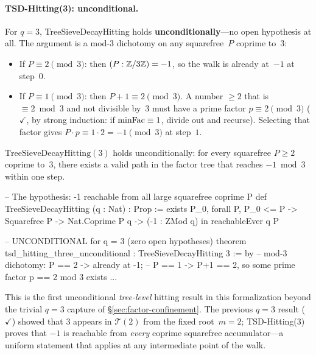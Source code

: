 \paragraph{TSD-Hitting(3): unconditional.}
For $q = 3$, TreeSieveDecayHitting holds \textbf{unconditionally}---no
open hypothesis at all.  The argument is a mod-$3$ dichotomy on any
squarefree~$P$ coprime to~$3$:
\begin{itemize}
\item If $P \equiv 2 \pmod{3}$: then $(P : \mathbb{Z}/3\mathbb{Z}) = -1$, so the
  walk is already at~$-1$ at step~$0$.
\item If $P \equiv 1 \pmod{3}$: then $P{+}1 \equiv 2 \pmod{3}$.
  A number $\geq 2$ that is $\equiv 2 \bmod 3$ and not divisible by~$3$
  must have a prime factor $p \equiv 2 \pmod{3}$
  (
  {\color{leanink}$\checkmark$},
  by strong induction: if $\mathrm{minFac} \equiv 1$, divide out and recurse).
  Selecting that factor gives $P \cdot p \equiv 1 \cdot 2 = -1 \pmod{3}$
  at step~$1$.
\end{itemize}
\begin{keyresult}
\begin{theorem}
$\mathrm{TreeSieveDecayHitting}(3)$ holds unconditionally: for every
squarefree $P \geq 2$ coprime to~$3$, there exists a valid path in
the factor tree that reaches $-1 \bmod 3$ within one step.
\end{theorem}
\end{keyresult}

\begin{leancode}
-- The hypothesis: -1 reachable from all large squarefree coprime P
def TreeSieveDecayHitting (q : Nat) : Prop :=
  exists P_0, forall P, P_0 <= P -> Squarefree P -> Nat.Coprime P q ->
    (-1 : ZMod q) in reachableEver q P

-- UNCONDITIONAL for q = 3 (zero open hypotheses)
theorem tsd_hitting_three_unconditional : TreeSieveDecayHitting 3 := by
  -- mod-3 dichotomy: P == 2 -> already at -1;
  -- P == 1 -> P+1 == 2, so some prime factor p == 2 mod 3 exists
  ...
\end{leancode}

\noindent
This is the first unconditional \emph{tree-level} hitting result in this
formalization beyond the trivial $q = 3$ capture of
\S\ref{sec:factor-confinement}.
The previous $q{=}3$ result
(
{\color{leanink}$\checkmark$})
showed that $3$ appears in $\mathcal{T}(2)$ from the fixed root~$m{=}2$;
TSD-Hitting(3) proves that $-1$ is reachable from \emph{every}
coprime squarefree accumulator---a uniform statement that applies at
any intermediate point of the walk.

